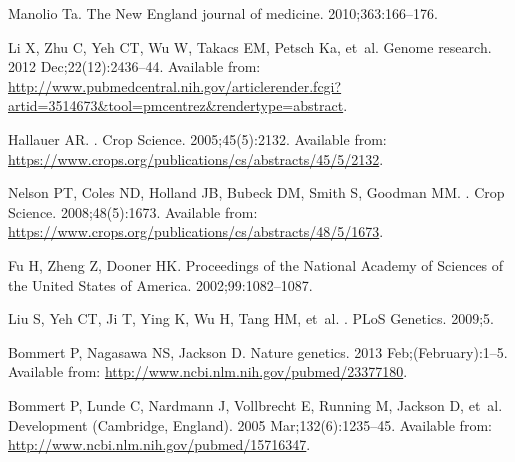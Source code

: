 \documentclass[10pt,letterpaper]{article}
\begin{document}
\begin{thebibliography}{10}
Manolio Ta.
\newblock The New England journal of medicine. 2010;363:166--176.

Li X, Zhu C, Yeh CT, Wu W, Takacs EM, Petsch Ka, et~al.
\newblock Genome research. 2012 Dec;22(12):2436--44.
\newblock Available from:
  \url{http://www.pubmedcentral.nih.gov/articlerender.fcgi?artid=3514673\&tool=pmcentrez\&rendertype=abstract}.

Hallauer AR.
.
\newblock Crop Science. 2005;45(5):2132.
\newblock Available from:
  \url{https://www.crops.org/publications/cs/abstracts/45/5/2132}.

Nelson PT, Coles ND, Holland JB, Bubeck DM, Smith S, Goodman MM.
.
\newblock Crop Science. 2008;48(5):1673.
\newblock Available from:
  \url{https://www.crops.org/publications/cs/abstracts/48/5/1673}.

Fu H, Zheng Z, Dooner HK.
\newblock Proceedings of the National Academy of Sciences of the United States
  of America. 2002;99:1082--1087.

Liu S, Yeh CT, Ji T, Ying K, Wu H, Tang HM, et~al.
.
\newblock PLoS Genetics. 2009;5.

Bommert P, Nagasawa NS, Jackson D.
\newblock Nature genetics. 2013 Feb;(February):1--5.
\newblock Available from: \url{http://www.ncbi.nlm.nih.gov/pubmed/23377180}.

Bommert P, Lunde C, Nardmann J, Vollbrecht E, Running M, Jackson D, et~al.
\newblock Development (Cambridge, England). 2005 Mar;132(6):1235--45.
\newblock Available from: \url{http://www.ncbi.nlm.nih.gov/pubmed/15716347}.


\end{thebibliography}
\end{document}
